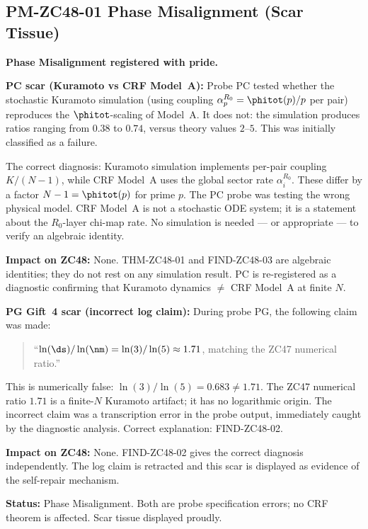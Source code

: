 \documentclass[12pt, a4paper]{article}
\begin{document}
\subsection{PM-ZC48-01 \quad Phase Misalignment (Scar Tissue)}
\label{sec:pm01}


\begin{openqbox}[title={PM-ZC48-01: Two Probe Specification
  Errors (Scar Tissue)}]
\textbf{Phase Misalignment registered with pride.}

\medskip
\textbf{PC scar (Kuramoto vs CRF Model~A):}
Probe PC tested whether the stochastic Kuramoto simulation
(using coupling $\alpha_p^{R_0} = \phitot(p)/p$ per pair)
reproduces the $\phitot$-scaling of Model~A.
It does not: the simulation produces ratios ranging from
$0.38$ to $0.74$, versus theory values $2$--$5$.
This was initially classified as a failure.

The correct diagnosis: Kuramoto simulation implements
per-pair coupling $K/(N-1)$, while CRF Model~A uses the
global sector rate $\alpha_i^{R_0}$.
These differ by a factor $N-1 = \phitot(p)$ for prime $p$.
The PC probe was testing the wrong physical model.
CRF Model~A is not a stochastic ODE system; it is a
statement about the $R_0$-layer chi-map rate.
No simulation is needed --- or appropriate --- to verify an
algebraic identity.

\textbf{Impact on ZC48:} None.
THM-ZC48-01 and FIND-ZC48-03 are algebraic identities;
they do not rest on any simulation result.
PC is re-registered as a diagnostic confirming that
Kuramoto dynamics $\neq$ CRF Model~A at finite $N$.

\medskip
\textbf{PG Gift~4 scar (incorrect log claim):}
During probe PG, the following claim was made:
\begin{quote}
``$\ln(\ds)/\ln(\nm) = \ln(3)/\ln(5) \approx 1.71$,
matching the ZC47 numerical ratio.''
\end{quote}
This is numerically false: $\ln(3)/\ln(5) = 0.683 \neq 1.71$.
The ZC47 numerical ratio $1.71$ is a finite-$N$ Kuramoto
artifact; it has no logarithmic origin.
The incorrect claim was a transcription error in the probe
output, immediately caught by the diagnostic analysis.
Correct explanation: FIND-ZC48-02.

\textbf{Impact on ZC48:} None.
FIND-ZC48-02 gives the correct diagnosis independently.
The log claim is retracted and this scar is displayed
as evidence of the self-repair mechanism.

\textbf{Status:} Phase Misalignment.
Both are probe specification errors; no CRF theorem is
affected. Scar tissue displayed proudly.
\end{openqbox}
\end{document}
